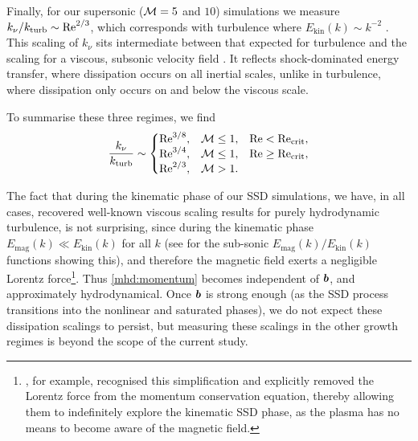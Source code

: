 Finally, for our supersonic ($\mathcal{M} = 5$ and $10$) simulations we measure $k_\nu / k_\mathrm{turb} \sim \mathrm{Re}^{2/3}$, which corresponds with \citet{burgers1948_turbulence_model} turbulence where $E_{\mathrm{kin}}(k) \sim k^{-2}$ \citep{schober2012magnetic, Federrath2021_sonic_scale}. This scaling of $k_\nu$ sits intermediate between that expected for \citet{kolmogorov1941dissipation} turbulence and the scaling for a viscous, subsonic velocity field . It reflects shock-dominated energy transfer, where dissipation occurs on all inertial scales, unlike in \citet{kolmogorov1941dissipation} turbulence, where dissipation only occurs on and below the viscous scale.

To summarise these three regimes, we find
\begin{align}
    \frac{k_{\nu}}{k_\mathrm{turb}}
        \sim \left\{\begin{matrix}
            \mathrm{Re}^{3/8}, & \mathcal{M} \leq 1, & \mathrm{Re} < \mathrm{Re}_\mathrm{crit}, \\
            \mathrm{Re}^{3/4}, & \mathcal{M} \leq 1, & \mathrm{Re} \geq \mathrm{Re}_\mathrm{crit}, \\
            \mathrm{Re}^{2/3}, & \mathcal{M} > 1 .
        \end{matrix}\right.
    \label{eqn:knu_scaling}
\end{align}

The fact that during the kinematic phase of our SSD simulations, we have, in all cases, recovered well-known viscous scaling results for purely hydrodynamic turbulence, is not surprising, since during the kinematic phase \mbox{$E_\mathrm{mag}(k) \ll E_\mathrm{kin}(k)$} for all $k$ (see \citealt{beattie2022growth} for the sub-sonic $E_\mathrm{mag}(k)/E_\mathrm{kin}(k)$ functions showing this), and therefore the magnetic field exerts a negligible Lorentz force\footnote{
    \citet{brandenburg2023dissipative}, for example, recognised this simplification and explicitly removed the Lorentz force from the momentum conservation equation, thereby allowing them to indefinitely explore the kinematic SSD phase, as the plasma has no means to become aware of the magnetic field.
}. Thus \autoref{mhd:momentum} becomes independent of $\bm{b}$, and approximately hydrodynamical. Once $\bm{b}$ is strong enough (as the SSD process transitions into the nonlinear and saturated phases), we do not expect these dissipation scalings to persist, but measuring these scalings in the other growth regimes is beyond the scope of the current study.

